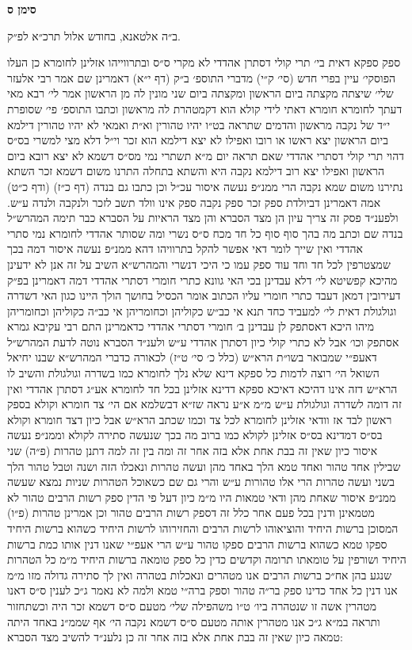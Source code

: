 \documentclass[12pt, openany]{book}
\newcommand{\chapname}{}
\newcommand{\newchap}[1]{
	\addcontentsline{toc}{chapter}{#1}
	\renewcommand{\chapname}{#1}
		\begin{center}
			\textbf{%
\fontsize{16pt}{16pt}\selectfont
				#1}
		\end{center}
}
\begin{document}
\newchap{סימן ס}
\begin{multicols}{2}
ב״ה אלטאנא, בחודש אלול תרכ״א לפ״ק.\\\vspace{0pt}

ספק ספקא דאית בי׳ תרי קולי דסתרן אהדדי לא מקרי ס״ס ובתרווייהו אזלינן לחומרא כן העלו הפוסקי׳ עיין בפרי חדש (סי׳ ק״י) מדברי התוספ׳ ב״ק (דף י״א) דאמרינן שם אמר רבי אלעזר שלי׳ שיצתה מקצתה ביום הראשון ומקצתה ביום שני מונין לה מן הראשון אמר לי׳ רבא מאי דעתך לחומרא חומרא דאתי לידי קולא הוא דקמטהרת לה מראשון וכתבו התוספ׳ פי׳ שסופרת י״ד של נקבה מראשון והדמים שתראה בט״ו יהיו טהורין וא״ת ואמאי לא יהיו טהורין דילמא ביום הראשון יצא ראשו או רובו ואפילו לא יצא דילמא הוא זכר וי״ל דלא מצי למשרי בס״ס דהוי תרי קולי דסתרי אהדדי שאם תראה יום מ״א תשתרי נמי מס״ס דשמא לא יצא רובא ביום הראשון ואפילו יצא רוב דילמא נקבה היא והשתא בתחלה התרנו משום דשמא זכר השתא נתירנו משום שמא נקבה הרי ממנ״פ נעשה איסור עכ״ל וכן כתבו גם בנדה (דף כ״ז) (ודף כ״ט) אמה דאמרינן דביולדת ספק זכר ספק נקבה ספק אינו וולד תשב לזכר ולנקבה ולנדה ע״ש. ולפענ״ד פסק זה צריך עיון הן מצד הסברא והן מצד הראיות על הסברא כבר תימה המהרש״ל בנדה שם וכתב מה בהך סוף סוף כל חד מכח ס״ס נשרי ומה שסותר אהדדי לחומרא נמי סתרי אהדדי ואין שייך לומר דאי אפשר להקל בתרוויהו דהא ממנ״פ נעשה איסור דמה בכך שמצטרפין לכל חד וחד עוד ספק עמו כי היכי דנשרי והמהרש״א השיב על זה אנן לא ידעינן מהיכא קפשיטא לי׳ דלא עבדינן בכי האי גוונא כתרי חומרי דסתרי אהדדי דמה דאמרינן בפ״ק דעירובין דמאן דעבד כתרי חומרי עליו הכתוב אומר הכסיל בחושך הולך היינו כגון האי דשדרה וגולגולת דאית לי׳ למעביד כחד תנא אי כב״ש כקוליהן וכחומריהן אי כב״ה כקוליהן וכחומריהן מיהו היכא דאסתפק לן עבדינן ב׳ חומרי דסתרי אהדדי כדאמרינן התם רבי עקיבא גמרא אסתפק וכו׳ אבל לא כתרי קולי כיון דסתרן אהדדי ע״ש ולענ״ד הסברא נוטה לדעת המהרש״ל דאעפ״י שמבואר בשו״ת הרא״ש (כלל כ׳ סי׳ ט״ז) לכאורה כדברי המהרש״א שבנו יחיאל השואל הי׳ רוצה לדמות כל ספקא דינא שלא נלך לחומרא כמו בשדרה וגולגולת והשיב לו הרא״ש דזה אינו דהיכא דאיכא ספקא דדינא אזלינן בכל חד לחומרא אע״ג דסתרן אהדדי ואין זה דומה לשדרה וגולגולת ע״ש מ״מ א״ע נראה שז״א דבשלמא אם הי׳ צד חומרא וקולא בספק ראשון לבד אז וודאי אזלינן לחומרא לכל צד וכמו שכתב הרא״ש אבל כיון דצד חומרא וקולא בס״ס דמדינא בס״ס אזלינן לקולא כמו ברוב מה בכך שנעשה סתירה לקולא וממנ״פ נעשה איסור כיון שאין זה בבת אחת אלא בזה אחר זה ומה בין זה למה דתנן טהרות (פ״ה) שני שבילין אחד טהור ואחד טמא הלך באחד מהן ועשה טהרות ונאכלו הזה ושנה וטבל טהור הלך בשני ועשה טהרות הרי אלו טהורות ע״ש והרי גם שם כשאוכל הטהרות שניות נמצא שעשה ממנ״פ איסור שאחת מהן ודאי טמאות היו מ״מ כיון דעל פי הדין ספק רשות הרבים טהור לא מטמאינן ודנין בכל פעם אחר כלל זה דספק רשות הרבים טהור וכן אמרינן טהרות (פ״ו) המסוכן ברשות היחיד והוציאוהו לרשות הרבים והחזירוהו לרשות היחיד כשהוא ברשות היחיד ספקו טמא כשהוא ברשות הרבים ספקו טהור ע״ש הרי אעפ״י שאנו דנין אותו כמת ברשות היחיד ושורפין על טומאתו תרומה וקדשים כדין כל ספק טומאה ברשות היחיד מ״מ כל הטהרות שנגע בהן אח״כ ברשות הרבים אנו מטהרים ונאכלות בטהרה ואין לך סתירה גדולה מזו מ״מ אנו דנין כל אחד כדינו ספק בר״ה טהור וספק ברה״י טמא ולמה לא נאמר ג״כ לענין ס״ס דאנו מטהרין אשה זו שנטהרה ביו׳ ט״ו משהפילה שלי׳ מטעם ס״ס דשמא זכר היה וכשתחזור ותראה במ״א ג״כ אנו מטהרין אותה מטעם ס״ס דשמא נקבה הי׳ אף שממ״נ באחד היתה טמאה כיון שאין זה בבת אחת אלא בזה אחר זה כן נלענ״ד להשיב מצד הסברא:\\\vspace{0pt}


\end{multicols}
\end{document}
